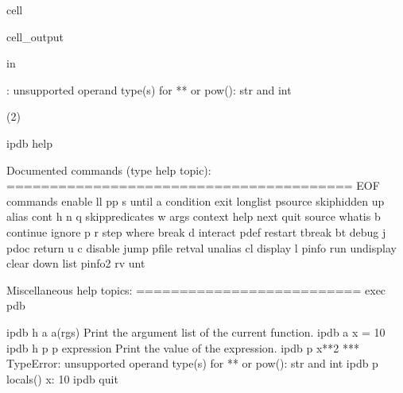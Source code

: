 \documentclass[letterpaper,10pt,english]{jupyterBook}
\begin{document}
\begin{sphinxuseclass}{cell}
\begin{sphinxVerbatimOutput}
\begin{sphinxuseclass}{cell_output}
\begin{sphinxVerbatim}[commandchars=\\\{\}]
 in 
  
       
       
      

: unsupported operand type(s) for ** or pow(): \PYGZsq{}str\PYGZsq{} and \PYGZsq{}int\PYGZsq{}
\end{sphinxVerbatim}

\begin{sphinxVerbatim}[commandchars=\\\{\}]
\PYGZgt{} (2)

ipdb\PYGZgt{} help

Documented commands (type help \PYGZlt{}topic\PYGZgt{}):
========================================
EOF    commands   enable    ll        pp       s                until 
a      condition  exit      longlist  psource  skip\PYGZus{}hidden      up    
alias  cont       h         n         q        skip\PYGZus{}predicates  w     
args   context    help      next      quit     source           whatis
b      continue   ignore    p         r        step             where 
break  d          interact  pdef      restart  tbreak         
bt     debug      j         pdoc      return   u              
c      disable    jump      pfile     retval   unalias        
cl     display    l         pinfo     run      undisplay      
clear  down       list      pinfo2    rv       unt            

Miscellaneous help topics:
==========================
exec  pdb

ipdb\PYGZgt{} h a
a(rgs)
        Print the argument list of the current function.
ipdb\PYGZgt{} a
x = \PYGZsq{}10\PYGZsq{}
ipdb\PYGZgt{} h p
p expression
        Print the value of the expression.
ipdb\PYGZgt{} p x**2
*** TypeError: unsupported operand type(s) for ** or pow(): \PYGZsq{}str\PYGZsq{} and \PYGZsq{}int\PYGZsq{}
ipdb\PYGZgt{} p locals()
\PYGZob{}\PYGZsq{}x\PYGZsq{}: \PYGZsq{}10\PYGZsq{}\PYGZcb{}
ipdb\PYGZgt{} quit
\end{sphinxVerbatim}

\end{sphinxuseclass}\end{sphinxVerbatimOutput}

\end{sphinxuseclass}
\end{document}
